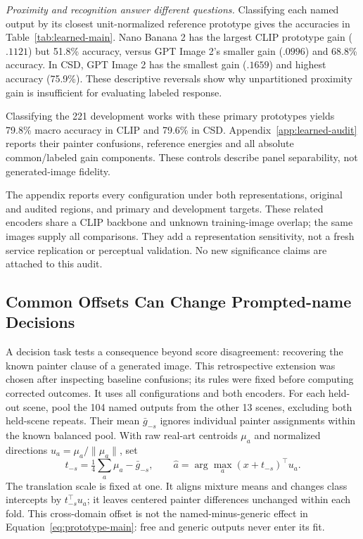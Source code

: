 \emph{Proximity and recognition answer different questions.}
Classifying each named output by its closest unit-normalized reference prototype
gives the accuracies in Table~\ref{tab:learned-main}. Nano Banana 2 has the largest
CLIP prototype gain ($.1121$) but 51.8\% accuracy, versus GPT Image 2's smaller
gain ($.0996$) and 68.8\% accuracy. In CSD, GPT Image 2 has the smallest gain
($.1659$) and highest accuracy (75.9\%). These descriptive reversals show why
unpartitioned proximity gain is insufficient for evaluating labeled response.

Classifying the 221 development works with these primary prototypes yields
79.8\% macro accuracy in CLIP and 79.6\% in CSD. Appendix~\ref{app:learned-audit}
reports their painter confusions, reference energies and all absolute
common/labeled gain components. These controls describe panel separability,
not generated-image fidelity.

The appendix reports every configuration under both representations, original
and audited regions, and primary and development targets. These related
encoders share a CLIP backbone and unknown training-image overlap; the same
images supply all comparisons. They add a representation sensitivity, not a
fresh service replication or perceptual validation. No new significance claims
are attached to this audit.

\subsection{Common Offsets Can Change Prompted-name Decisions}\label{sec:transfer}
A decision task tests a consequence beyond score disagreement: recovering the
known painter clause of a generated image. This retrospective extension was
chosen after inspecting baseline confusions; its rules were fixed before
computing corrected outcomes. It uses all configurations and both encoders.
For each held-out scene, pool the 104 named outputs from the other 13 scenes,
excluding both held-scene repeats. Their mean $\bar g_{-s}$ ignores individual
painter assignments within the known balanced pool. With raw real-art centroids
$\mu_a$ and normalized directions $u_a=\mu_a/\|\mu_a\|$, set
\begin{equation}
 t_{-s}=\tfrac14\sum_a\mu_a-\bar g_{-s},\qquad
 \hat a=\arg\max_a (x+t_{-s})^\top u_a.
 \label{eq:transfer-main}
\end{equation}
The translation scale is fixed at one. It aligns mixture means and changes
class intercepts by $t_{-s}^\top u_a$; it leaves centered painter differences
unchanged within each fold. This cross-domain offset is not the
named-minus-generic effect in Equation~\ref{eq:prototype-main}: free and generic
outputs never enter its fit.

